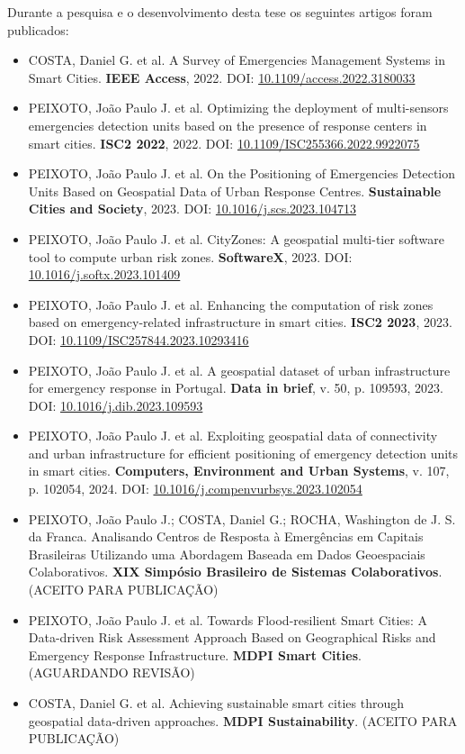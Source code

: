 \begin{refsection}
Durante a pesquisa e o desenvolvimento desta tese os seguintes artigos foram publicados:

\begin{itemize}
  \item COSTA, Daniel G. et al. A Survey of Emergencies Management Systems in Smart Cities. \textbf{IEEE Access}, 2022. DOI: \hyperref{https://doi.org/10.1109/access.2022.3180033}{}{}{10.1109/access.2022.3180033}
  \item PEIXOTO, João Paulo J. et al. Optimizing the deployment of multi-sensors emergencies detection units based on the presence of response centers in smart cities. \textbf{ISC2 2022}, 2022. DOI: \hyperref{https://doi.org/10.1109/ISC255366.2022.9922075}{}{}{10.1109/ISC255366.2022.9922075}
  \item PEIXOTO, João Paulo J. et al. On the Positioning of Emergencies Detection Units Based on Geospatial Data of Urban Response Centres. \textbf{Sustainable Cities and Society}, 2023. DOI: \hyperref{https://doi.org/10.1016/j.scs.2023.104713}{}{}{10.1016/j.scs.2023.104713}
  \item PEIXOTO, João Paulo J. et al. CityZones: A geospatial multi-tier software tool to compute urban risk zones. \textbf{SoftwareX}, 2023. DOI: \hyperref{https://doi.org/10.1016/j.softx.2023.101409}{}{}{10.1016/j.softx.2023.101409}
  \item PEIXOTO, João Paulo J. et al. Enhancing the computation of risk zones based on emergency-related infrastructure in smart cities. \textbf{ISC2 2023}, 2023. DOI: \hyperref{https://doi.org/10.1109/ISC257844.2023.10293416}{}{}{10.1109/ISC257844.2023.10293416}
  \item PEIXOTO, João Paulo J. et al. A geospatial dataset of urban infrastructure for emergency response in Portugal. \textbf{Data in brief}, v. 50, p. 109593, 2023. DOI: \hyperref{https://doi.org/10.1016/j.dib.2023.109593}{}{}{10.1016/j.dib.2023.109593}
  \item PEIXOTO, João Paulo J. et al. Exploiting geospatial data of connectivity and urban infrastructure for efficient positioning of emergency detection units in smart cities. \textbf{Computers, Environment and Urban Systems}, v. 107, p. 102054, 2024. DOI: \hyperref{https://doi.org/10.1016/j.compenvurbsys.2023.102054}{}{}{10.1016/j.compenvurbsys.2023.102054}
  \item PEIXOTO, João Paulo J.; COSTA, Daniel G.; ROCHA, Washington de J. S. da Franca. Analisando Centros de Resposta à Emergências em Capitais Brasileiras Utilizando uma Abordagem Baseada em Dados Geoespaciais Colaborativos. \textbf{XIX Simpósio Brasileiro de Sistemas Colaborativos}. (ACEITO PARA PUBLICAÇÃO)
  \item PEIXOTO, João Paulo J. et al. Towards Flood-resilient Smart Cities: A Data-driven Risk Assessment Approach Based on Geographical Risks and Emergency Response Infrastructure. \textbf{MDPI Smart Cities}. (AGUARDANDO REVISÃO)
  \item COSTA, Daniel G. et al. Achieving sustainable smart cities through geospatial data-driven approaches. \textbf{MDPI Sustainability}. (ACEITO PARA PUBLICAÇÃO)
\end{itemize}


\end{refsection}
